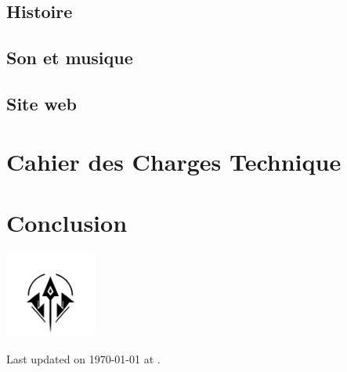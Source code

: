 \documentclass[12pt]{article}
\begin{document}
\subsection{Histoire}


\subsection{Son et musique}


\subsection{Site web}



\newpage
\section{Cahier des Charges Technique}


\newpage
\section{Conclusion}


\centering
\vspace*{1.8cm}
\includegraphics[width=3cm]{0.format/logo.png}

\vspace*{1cm}
Last updated on \today{} at \currenttime.
\end{document}
